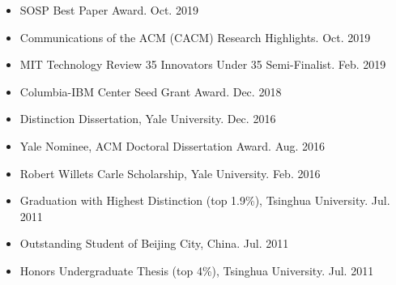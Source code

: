 \documentclass[10pt]{article}
\newenvironment{innerlist}[1][\enskip\textbullet]%
        {\begin{itemize}[#1,leftmargin=25pt,parsep=0pt,itemsep=2pt,topsep=2pt,partopsep=0pt]}
        {\end{itemize}}
\begin{document}
\begin{innerlist}

\item[] 
SOSP Best Paper Award.
\hfill{Oct. 2019}
 \vspace{0.05in}

\item[] 
Communications of the ACM (CACM) Research Highlights.
\hfill{Oct. 2019}

 \vspace{0.05in}

\item[] MIT Technology Review 35 Innovators Under 35 Semi-Finalist.  
\hfill{Feb. 2019}

\vspace{0.05in}

\item[] Columbia-IBM Center Seed Grant Award. \hfill{Dec. 2018}%
\vspace{0.05in}

\item[] Distinction Dissertation, Yale University. \hfill{Dec. 2016}

\vspace{0.05in}

\item[] Yale Nominee, ACM Doctoral Dissertation Award. \hfill{Aug. 2016}

\vspace{0.05in}

\item[] Robert Willets Carle Scholarship, Yale University. \hfill Feb. 2016

\vspace{0.05in}

\item[] Graduation with Highest Distinction (top 1.9\%), Tsinghua University. \hfill Jul. 2011

\vspace{0.05in}

\item[] Outstanding Student of Beijing City, China. \hfill Jul. 2011

\vspace{0.05in}

\item[] Honors Undergraduate Thesis (top 4\%), Tsinghua University. \hfill{Jul. 2011}

%
%
%
%
%
\end{innerlist}
\end{document}
